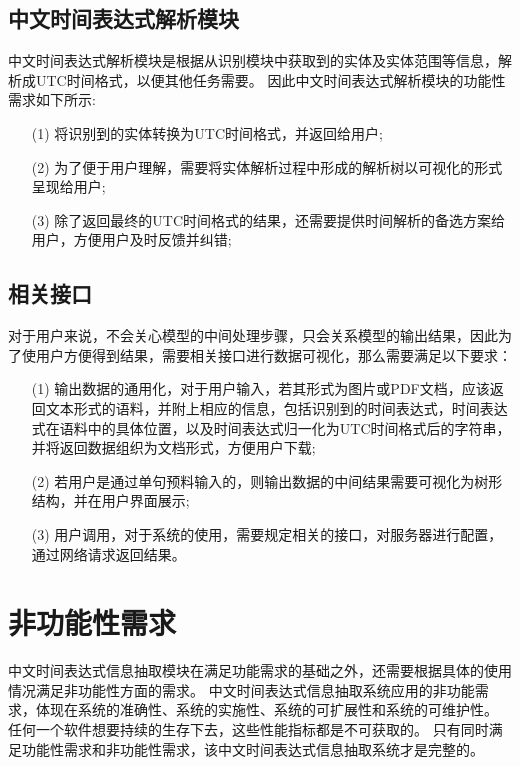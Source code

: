 \subsection{中文时间表达式解析模块}

中文时间表达式解析模块是根据从识别模块中获取到的实体及实体范围等信息，解析成UTC时间格式，以便其他任务需要。
因此中文时间表达式解析模块的功能性需求如下所示:
\begin{enumerate}
    \item[(1)] 将识别到的实体转换为UTC时间格式，并返回给用户;
    \item[(2)] 为了便于用户理解，需要将实体解析过程中形成的解析树以可视化的形式呈现给用户;
    \item[(3)] 除了返回最终的UTC时间格式的结果，还需要提供时间解析的备选方案给用户，方便用户及时反馈并纠错;
\end{enumerate}

\subsection{相关接口}

对于用户来说，不会关心模型的中间处理步骤，只会关系模型的输出结果，因此为了使用户方便得到结果，需要相关接口进行数据可视化，那么需要满足以下要求：
\begin{enumerate}
    \item[(1)] 输出数据的通用化，对于用户输入，若其形式为图片或PDF文档，应该返回文本形式的语料，并附上相应的信息，包括识别到的时间表达式，时间表达式在语料中的具体位置，以及时间表达式归一化为UTC时间格式后的字符串，并将返回数据组织为文档形式，方便用户下载;
    \item[(2)] 若用户是通过单句预料输入的，则输出数据的中间结果需要可视化为树形结构，并在用户界面展示;
    \item[(3)]  用户调用，对于系统的使用，需要规定相关的接口，对服务器进行配置，通过网络请求返回结果。
\end{enumerate}

\section{非功能性需求}

中文时间表达式信息抽取模块在满足功能需求的基础之外，还需要根据具体的使用情况满足非功能性方面的需求。
中文时间表达式信息抽取系统应用的非功能需求，体现在系统的准确性、系统的实施性、系统的可扩展性和系统的可维护性。
任何一个软件想要持续的生存下去，这些性能指标都是不可获取的。 只有同时满足功能性需求和非功能性需求，该中文时间表达式信息抽取系统才是完整的。

